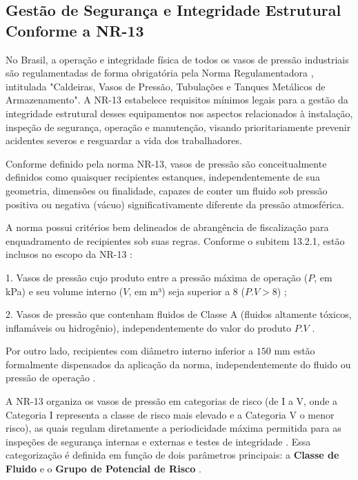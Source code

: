 \subsection{Gestão de Segurança e Integridade Estrutural Conforme a NR-13}

No Brasil, a operação e integridade física de todos os vasos de pressão industriais são regulamentadas de forma obrigatória pela Norma Regulamentadora , intitulada "Caldeiras, Vasos de Pressão, Tubulações e Tanques Metálicos de Armazenamento". A NR-13 estabelece requisitos mínimos legais para a gestão da integridade estrutural desses equipamentos nos aspectos relacionados à instalação, inspeção de segurança, operação e manutenção, visando prioritariamente prevenir acidentes severos e resguardar a vida dos trabalhadores.

Conforme definido pela norma NR-13, vasos de pressão são conceitualmente definidos como quaisquer recipientes estanques, independentemente de sua geometria, dimensões ou finalidade, capazes de conter um fluido sob pressão positiva ou negativa (vácuo) significativamente diferente da pressão atmosférica.

A norma possui critérios bem delineados de abrangência de fiscalização para enquadramento de recipientes sob suas regras. Conforme o subitem 13.2.1, estão inclusos no escopo da NR-13 \cite{brasil_nr13_2022}:

1. Vasos de pressão cujo produto entre a pressão máxima de operação ($P$, em kPa) e seu volume interno ($V$, em m³) seja superior a 8 ($P.V > 8$) \cite{brasil_nr13_2022};

2. Vasos de pressão que contenham fluidos de Classe A (fluidos altamente tóxicos, inflamáveis ou hidrogênio), independentemente do valor do produto $P.V$ \cite{brasil_nr13_2022}.

Por outro lado, recipientes com diâmetro interno inferior a $150$ mm estão formalmente dispensados da aplicação da norma, independentemente do fluido ou pressão de operação \cite{brasil_nr13_2022}.

A NR-13 organiza os vasos de pressão em categorias de risco (de I a V, onde a Categoria I representa a classe de risco mais elevado e a Categoria V o menor risco), as quais regulam diretamente a periodicidade máxima permitida para as inspeções de segurança internas e externas e testes de integridade \cite{brasil_nr13_2022}. Essa categorização é definida em função de dois parâmetros principais: a \textbf{Classe de Fluido} e o \textbf{Grupo de Potencial de Risco} \cite{brasil_nr13_2022}.

